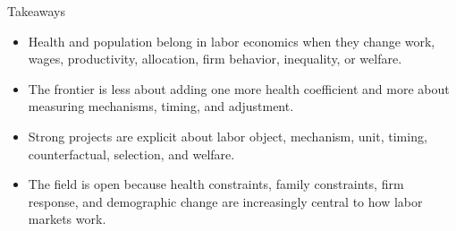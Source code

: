 \documentclass[aspectratio=169,11pt]{beamer}
\begin{document}
\begin{frame}{Takeaways}
\begin{itemize}
    \item Health and population belong in labor economics when they change work, wages, productivity, allocation, firm behavior, inequality, or welfare.
    \item The frontier is less about adding one more health coefficient and more about measuring mechanisms, timing, and adjustment.
    \item Strong projects are explicit about labor object, mechanism, unit, timing, counterfactual, selection, and welfare.
    \item The field is open because health constraints, family constraints, firm response, and demographic change are increasingly central to how labor markets work.
\end{itemize}
\end{frame}
\end{document}
